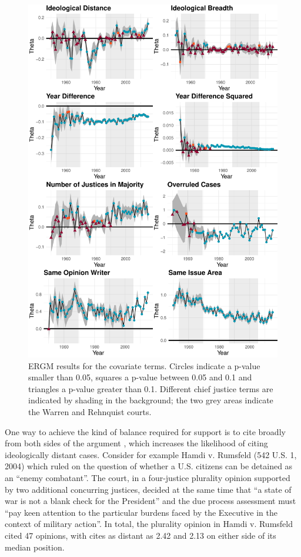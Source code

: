 \documentclass{cup-pan}
\begin{document}
\begin{figure}
\centering
\includegraphics[width=14cm ]{SCC_results_2.pdf}
\caption{ERGM results for the covariate terms. Circles indicate a p-value smaller than 0.05, squares a p-value between 0.05 and 0.1 and triangles a p-value greater than 0.1. Different chief justice terms are indicated by shading in the background; the two grey areas indicate the Warren and Rehnquist courts.}
 \label{SCC_results_2}
\end{figure}

One way to achieve the kind of balance required for support is to cite broadly from both sides of the argument \citep{wilkinson2005rehnquist}, which increases the likelihood of citing ideologically distant cases. Consider for example Hamdi v. Rumsfeld (542 U.S. 1, 2004) which ruled on the question of whether a U.S. citizens can be detained as an ``enemy combatant''. The court, in a four-justice plurality opinion supported by two additional concurring justices, decided at the same time that ``a state of war is not a blank check for the President'' and the due process assessment must ``pay keen attention to the particular burdens faced by the Executive in the context of military action''. In total, the plurality opinion in Hamdi v. Rumsfeld cited 47 opinions, with cites as distant as 2.42 and 2.13 on either side of its median position.
\end{document}
